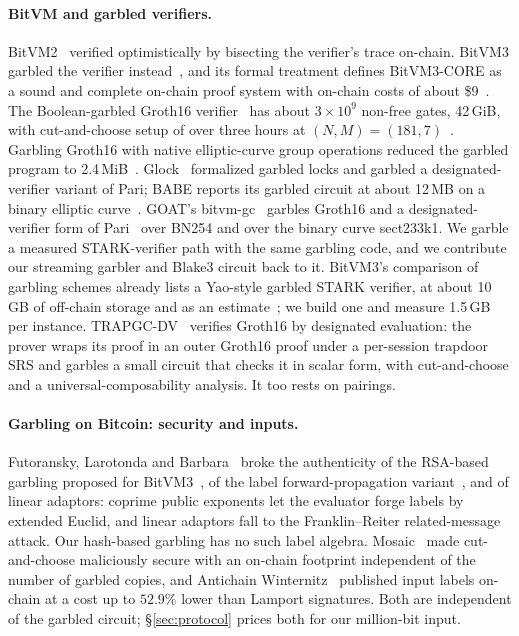 \documentclass[11pt]{article}
\begin{document}
\paragraph{BitVM and garbled verifiers.} BitVM2~\cite{laa25bitvm2} verified
optimistically by bisecting the verifier's trace on-chain. BitVM3 garbled the
verifier instead~\cite{lin25bitvm3,che25sok}, and its formal treatment defines
BitVM3-CORE as a sound and complete on-chain proof system with on-chain costs of
about \$9~\cite{bitvm3paper}. The Boolean-garbled Groth16 verifier~\cite{bit25b}
has about $3\times10^9$ non-free gates, 42\,GiB, with cut-and-choose setup of over
three hours at $(N,M)=(181,7)$~\cite{babe2026}. Garbling Groth16 with native
elliptic-curve group operations reduced the garbled program to
2.4\,MiB~\cite{kflt26native}. Glock~\cite{eag25glock} formalized garbled locks and
garbled a designated-verifier variant of Pari; BABE reports its garbled circuit at
about 12\,MB on a binary elliptic curve~\cite{babe2026}. GOAT's
bitvm-gc~\cite{bitvmgc} garbles Groth16 and a designated-verifier form of
Pari~\cite{garudapari} over BN254 and over the binary curve sect233k1. We garble a
measured STARK-verifier path with the same garbling code, and we contribute our
streaming garbler and Blake3 circuit back to it. BitVM3's comparison of garbling schemes already lists a
Yao-style garbled STARK verifier, at about 10\,GB of off-chain storage and as an
estimate~\cite[Table~9]{bitvm3paper}; we build one and measure 1.5\,GB per
instance. TRAPGC-DV~\cite{trapgcdv26} verifies Groth16 by designated evaluation:
the prover wraps its proof in an outer Groth16 proof under a per-session trapdoor
SRS and garbles a small circuit that checks it in scalar form, with
cut-and-choose and a universal-composability analysis. It too rests on pairings.

\paragraph{Garbling on Bitcoin: security and inputs.} Futoransky, Larotonda and
Barbara~\cite{flb25} broke the authenticity of the RSA-based garbling proposed for
BitVM3~\cite{lin25bitvm3}, of the label forward-propagation variant~\cite{fdz25},
and of linear adaptors: coprime public exponents let the evaluator forge labels by
extended Euclid, and linear adaptors fall to the Franklin--Reiter related-message
attack. Our hash-based garbling has no such label algebra. Mosaic~\cite{mosaic26}
made cut-and-choose maliciously secure with an on-chain footprint independent of
the number of garbled copies, and Antichain Winternitz~\cite{antichain26} published
input labels on-chain at a cost up to $52.9\%$ lower than Lamport signatures. Both
are independent of the garbled circuit; \S\ref{sec:protocol} prices both for our
million-bit input.
\end{document}
